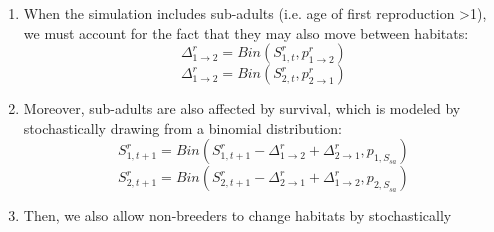 \begin{enumerate}
\begin{enumerate}
\begin{equation*}
{x} \right)
      \end{equation*}
Where, in this case, $x \in \{ {b}_{s} , {b}_{f} \}$.
    \item Then, the number of successful and failed breeders will be updated:
      \begin{equation*}
{A}_{1,t}^{x} = {A}_{1,t}^{x} - {\Delta}_{1\rightarrow2}^{x} +
{\Delta}_{2\rightarrow1}^{x}
      \end{equation*}
      \begin{equation*}
{A}_{2,t}^{x} = {A}_{2,t}^{x} - {\Delta}_{2\rightarrow1}^{x} +
{\Delta}_{1\rightarrow2}^{x}
      \end{equation*}
    And thus, with the new calculation:
      \begin{equation*}
{A}_{1,t}^{b} = {A}_{1,t}^{{b}_{s}} + {A}_{1,t}^{{b}_{f}}
    \end{equation*}
    \begin{equation*}
{A}_{2,t}^{b} = {A}_{2,t}^{{b}_{s}} + {A}_{2,t}^{{b}_{f}}
      \end{equation*}
    Then the algorithm goes back to point a) above $m$ times, after which it 
jumps from e) above to point 3 just below.
  \end{enumerate}
  \item When the simulation includes sub-adults (i.e. age of first reproduction 
\textgreater{1}), we must account for the fact that they may also move between habitats:
    \begin{equation*}
{\Delta}_{1\rightarrow2}^{r} =Bin \left({S}_{1,t}^{r} , {p}_{1\rightarrow2}^{r}
\right)
    \end{equation*}
    \begin{equation*}
{\Delta}_{1\rightarrow2}^{r} =Bin \left({S}_{2,t}^{r} , {p}_{2\rightarrow1}^{r}
\right)
    \end{equation*}
  \item Moreover, sub-adults are also affected by survival, which is modeled by 
stochastically drawing from a binomial distribution:
    \begin{equation*}
{S}_{1,t+1}^{r} =Bin \left({S}_{1,t+1}^{r} - {\Delta}_{1\rightarrow2}^{r} +
{\Delta}_{2\rightarrow1}^{r} , {p}_{1, {S}_{sa}} \right)
    \end{equation*}
    \begin{equation*}
{S}_{2,t+1}^{r} =Bin \left({S}_{2,t+1}^{r} - {\Delta}_{2\rightarrow1}^{r} +
{\Delta}_{1\rightarrow2}^{r} , {p}_{{2,S}_{sa}} \right)
    \end{equation*}
  \item Then, we also allow non-breeders to change habitats by stochastically 

\end{enumerate}
